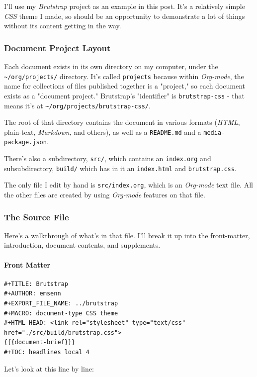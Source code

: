 \documentclass[11pt]{article}
\begin{document}
I'll use my \emph{Brutstrap} project as an example in this post. It's
a relatively simple \emph{CSS} theme I made, so should be an opportunity to
demonstrate a lot of things without its content getting in the way.
\subsubsection*{Document Project Layout}
\label{sec:org7c86384}
Each document exists in its own directory on my computer, under the
\texttt{\textasciitilde{}/org/projects/} directory. It's called \texttt{projects} because within
\emph{Org-mode}, the name for collections of files published together is a
"project," so each document exists as a "document project."
Brutstrap's "identifier" is \texttt{brutstrap-css} - that means it's at
\texttt{\textasciitilde{}/org/projects/brutstrap-css/}.

The root of that directory contains the document in various formats
(\emph{HTML}, plain-text, \emph{Markdown}, and others), as well as a \texttt{README.md}
and a \texttt{media-package.json}.

There's also a subdirectory, \texttt{src/}, which contains an \texttt{index.org} and
subsubdirectory, \texttt{build/} which has in it an \texttt{index.html} and
\texttt{brutstrap.css}.

The only file I edit by hand is \texttt{src/index.org}, which is an
\emph{Org-mode} text file. All the other files are created by using
\emph{Org-mode} features on that file.
\subsubsection*{The Source File}
\label{sec:org465a1ec}
Here's a walkthrough of what's in that file. I'll break it up into the
front-matter, introduction, document contents, and supplements.
\paragraph*{Front Matter}
\label{sec:org35e91f9}

\begin{verbatim}
#+TITLE: Brutstrap
#+AUTHOR: emsenn
#+EXPORT_FILE_NAME: ../brutstrap
#+MACRO: document-type CSS theme
#+HTML_HEAD: <link rel="stylesheet" type="text/css" href="./src/build/brutstrap.css">
{{{document-brief}}}
#+TOC: headlines local 4
\end{verbatim}

Let's look at this line by line:
\end{document}
